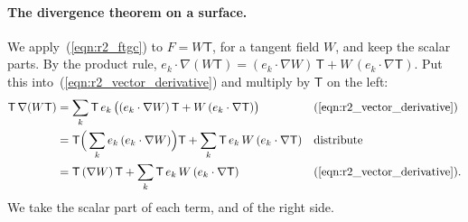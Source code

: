 \paragraph{The divergence theorem on a surface.} We apply~(\ref{eqn:r2_ftgc}) to $F = W\mathsf T$, for a tangent field $W$, and keep the scalar parts. By the product rule, $e_k\cdot\nabla(W\mathsf T) = (e_k\cdot\nabla W)\,\mathsf T + W\,(e_k\cdot\nabla\mathsf T)$. Put this into~(\ref{eqn:r2_vector_derivative}) and multiply by $\mathsf T$ on the left:
\begin{align*}
\mathsf T\,\nabla(W\mathsf T) &= \sum_k \mathsf T\, e_k\,\big((e_k\cdot\nabla W)\,\mathsf T + W\,(e_k\cdot\nabla\mathsf T)\big) && (\ref{eqn:r2_vector_derivative}) \\
&= \mathsf T\Big(\sum_k e_k\,(e_k\cdot\nabla W)\Big)\mathsf T + \sum_k \mathsf T\, e_k\, W\,(e_k\cdot\nabla\mathsf T) && \text{distribute} \\
&= \mathsf T\,(\nabla W)\,\mathsf T + \sum_k \mathsf T\, e_k\, W\,(e_k\cdot\nabla\mathsf T) && (\ref{eqn:r2_vector_derivative}) .
\end{align*}
We take the scalar part of each term, and of the right side.

